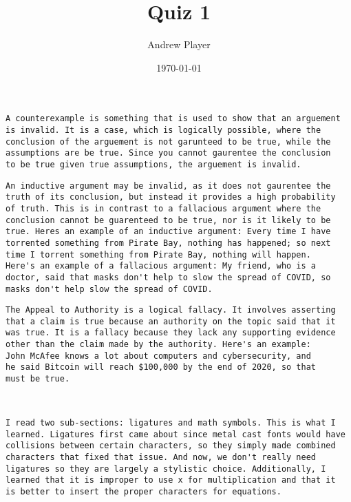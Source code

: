 \documentclass[12pt]{article}
\title{Quiz 1}
\author{Andrew Player}
\date{\today}
\makeatletter
\theoremstyle{homework}
\newenvironment{exercise}[1]
{\def\@currentlabel{#1}\exercisecore}
{\endexercisecore}
\makeatother
\begin{document}
\maketitle

\begin{exercise}{Question \# 1}
\end{exercise}
\begin{verbatim}
A counterexample is something that is used to show that an arguement
is invalid. It is a case, which is logically possible, where the 
conclusion of the arguement is not garunteed to be true, while the 
assumptions are be true. Since you cannot gaurentee the conclusion 
to be true given true assumptions, the arguement is invalid.
\end{verbatim}

\begin{exercise}{Question \# 2}
\end{exercise}
\begin{verbatim}
An inductive argument may be invalid, as it does not gaurentee the 
truth of its conclusion, but instead it provides a high probability 
of truth. This is in contrast to a fallacious argument where the 
conclusion cannot be guarenteed to be true, nor is it likely to be 
true. Heres an example of an inductive argument: Every time I have
torrented something from Pirate Bay, nothing has happened; so next
time I torrent something from Pirate Bay, nothing will happen. 
Here's an example of a fallacious argument: My friend, who is a 
doctor, said that masks don't help to slow the spread of COVID, so 
masks don't help slow the spread of COVID.

\end{verbatim}

\begin{exercise}{Question \# 3}
\end{exercise}
\begin{verbatim}
The Appeal to Authority is a logical fallacy. It involves asserting 
that a claim is true because an authority on the topic said that it 
was true. It is a fallacy because they lack any supporting evidence 
other than the claim made by the authority. Here's an example:
John McAfee knows a lot about computers and cybersecurity, and 
he said Bitcoin will reach $100,000 by the end of 2020, so that
must be true.



\end{verbatim}

\begin{exercise}{Question \# 4}
\end{exercise}
\begin{verbatim}
I read two sub-sections: ligatures and math symbols. This is what I
learned. Ligatures first came about since metal cast fonts would have
collisions between certain characters, so they simply made combined 
characters that fixed that issue. And now, we don't really need 
ligatures so they are largely a stylistic choice. Additionally, I 
learned that it is improper to use x for multiplication and that it 
is better to insert the proper characters for equations.

\end{verbatim}
\end{document}
